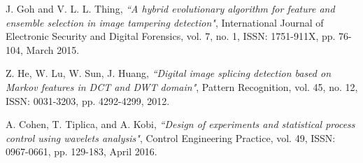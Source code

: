 J. Goh and V. L. L. Thing,
\textit{``A hybrid evolutionary algorithm for feature and ensemble selection in image tampering detection"},
International Journal of Electronic Security and Digital Forensics,
vol. 7, no. 1, ISSN: 1751-911X, pp. 76-104, March 2015.

Z. He, W. Lu, W. Sun, J. Huang,
\textit{``Digital image splicing detection based on Markov features in DCT and DWT domain"},
Pattern Recognition, vol. 45, no. 12, ISSN: 0031-3203, pp. 4292-4299, 2012.


A. Cohen, T. Tiplica, and A. Kobi,
\textit{``Design of experiments and statistical process control using wavelets analysis"},
Control Engineering Practice,
vol. 49, ISSN: 0967-0661, pp. 129-183, April 2016.

